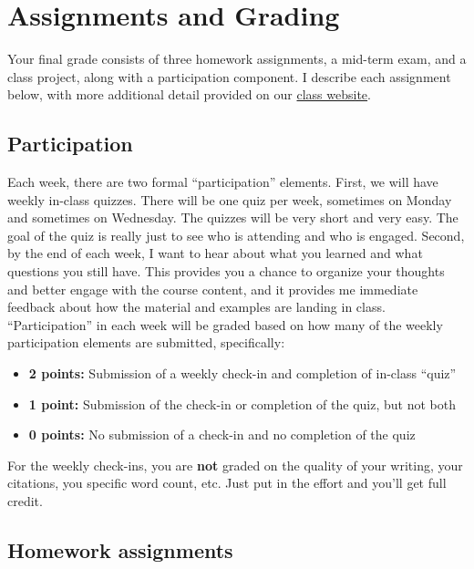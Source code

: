 \documentclass[11pt,]{article}
\providecommand{\tightlist}{%
  \setlength{\itemsep}{0pt}\setlength{\parskip}{0pt}}
\begin{document}
\hypertarget{assignments-and-grading}{%
\section{Assignments and Grading}\label{assignments-and-grading}}

Your final grade consists of three homework assignments, a mid-term
exam, and a class project, along with a participation component. I
describe each assignment below, with more additional detail provided on
our \href{https://mccarthy-spring21-econ372.netlify.app/}{class
website}.

\hypertarget{participation}{%
\subsection{Participation}\label{participation}}

Each week, there are two formal ``participation'' elements. First, we
will have weekly in-class quizzes. There will be one quiz per week,
sometimes on Monday and sometimes on Wednesday. The quizzes will be very
short and very easy. The goal of the quiz is really just to see who is
attending and who is engaged. Second, by the end of each week, I want to
hear about what you learned and what questions you still have. This
provides you a chance to organize your thoughts and better engage with
the course content, and it provides me immediate feedback about how the
material and examples are landing in class. ``Participation'' in each
week will be graded based on how many of the weekly participation
elements are submitted, specifically:

\begin{itemize}
\tightlist
\item
  \textbf{2 points:} Submission of a weekly check-in and completion of
  in-class ``quiz''
\item
  \textbf{1 point:} Submission of the check-in or completion of the
  quiz, but not both
\item
  \textbf{0 points:} No submission of a check-in and no completion of
  the quiz
\end{itemize}

For the weekly check-ins, you are \textbf{not} graded on the quality of
your writing, your citations, you specific word count, etc. Just put in
the effort and you'll get full credit.

\hypertarget{homework-assignments}{%
\subsection{Homework assignments}\label{homework-assignments}}
\end{document}
